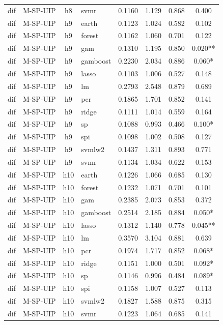 \begin{ThreePartTable}
\begin{longtable}[t]{llclcccc}
dif & M-SP-UIP & h8 & svmr & 0.1160 & 1.129 & 0.868 & 0.400\\
\addlinespace
dif & M-SP-UIP & h9 & earth & 0.1123 & 1.024 & 0.582 & 0.102\\
dif & M-SP-UIP & h9 & forest & 0.1162 & 1.060 & 0.701 & 0.122\\
dif & M-SP-UIP & h9 & gam & 0.1310 & 1.195 & 0.850 & 0.020**\\
dif & M-SP-UIP & h9 & gamboost & 0.2230 & 2.034 & 0.886 & 0.060*\\
dif & M-SP-UIP & h9 & lasso & 0.1103 & 1.006 & 0.527 & 0.148\\
dif & M-SP-UIP & h9 & lm & 0.2793 & 2.548 & 0.879 & 0.689\\
dif & M-SP-UIP & h9 & pcr & 0.1865 & 1.701 & 0.852 & 0.141\\
dif & M-SP-UIP & h9 & ridge & 0.1111 & 1.014 & 0.559 & 0.164\\
dif & M-SP-UIP & h9 & sp & 0.1088 & 0.993 & 0.466 & 0.100*\\
dif & M-SP-UIP & h9 & spi & 0.1098 & 1.002 & 0.508 & 0.127\\
dif & M-SP-UIP & h9 & svmlw2 & 0.1437 & 1.311 & 0.893 & 0.771\\
dif & M-SP-UIP & h9 & svmr & 0.1134 & 1.034 & 0.622 & 0.153\\
\addlinespace
dif & M-SP-UIP & h10 & earth & 0.1226 & 1.066 & 0.685 & 0.130\\
dif & M-SP-UIP & h10 & forest & 0.1232 & 1.071 & 0.701 & 0.101\\
dif & M-SP-UIP & h10 & gam & 0.2385 & 2.073 & 0.853 & 0.372\\
dif & M-SP-UIP & h10 & gamboost & 0.2514 & 2.185 & 0.884 & 0.050*\\
dif & M-SP-UIP & h10 & lasso & 0.1312 & 1.140 & 0.778 & 0.045**\\
dif & M-SP-UIP & h10 & lm & 0.3570 & 3.104 & 0.881 & 0.639\\
dif & M-SP-UIP & h10 & pcr & 0.1974 & 1.717 & 0.852 & 0.068*\\
dif & M-SP-UIP & h10 & ridge & 0.1151 & 1.000 & 0.501 & 0.092*\\
dif & M-SP-UIP & h10 & sp & 0.1146 & 0.996 & 0.484 & 0.089*\\
dif & M-SP-UIP & h10 & spi & 0.1158 & 1.007 & 0.527 & 0.113\\
dif & M-SP-UIP & h10 & svmlw2 & 0.1827 & 1.588 & 0.875 & 0.315\\
dif & M-SP-UIP & h10 & svmr & 0.1223 & 1.064 & 0.685 & 0.141\\

\end{longtable}
\end{ThreePartTable}
